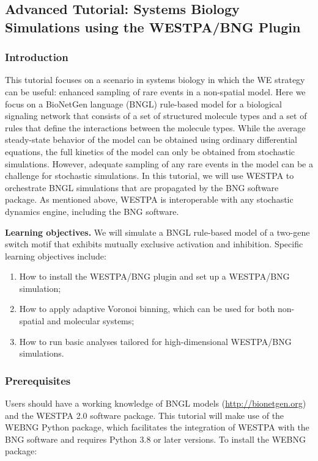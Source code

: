 \subsection{Advanced Tutorial: Systems Biology Simulations using the WESTPA/BNG Plugin}
\label{tut:bng-adv}

\subsubsection{Introduction}
This tutorial focuses on a scenario in systems biology in which the WE strategy can be useful: enhanced sampling of rare events in a non-spatial model. 
Here we focus on a BioNetGen language (BNGL) rule-based model for a biological signaling network that consists of a set of structured molecule types and a set of rules that define the interactions between the molecule types. 
While the average steady-state behavior of the model can be obtained using ordinary differential equations, the full kinetics of the model can only be obtained from stochastic simulations. 
However, adequate sampling of any rare events in the model can be a challenge for stochastic simulations. 
In this tutorial, we will use WESTPA to orchestrate BNGL simulations that are propagated by the BNG software package. 
As mentioned above, WESTPA is interoperable with any stochastic dynamics engine, including the BNG software.

\pagebreak

\textbf{Learning objectives.} We will simulate a BNGL rule-based model of a two-gene switch motif that exhibits mutually exclusive activation and inhibition.
Specific learning objectives include:
\begin{enumerate}
    \item How to install the WESTPA/BNG plugin and set up a WESTPA/BNG simulation; 
    \item How to apply adaptive Voronoi binning, which can be used for both non-spatial and molecular systems; 
    \item How to run basic analyses tailored for high-dimensional WESTPA/BNG simulations.
\end{enumerate} 

\subsubsection{Prerequisites}
Users should have a working knowledge of BNGL models ({\url{http://bionetgen.org}}) and the WESTPA 2.0 software package. 
This tutorial will make use of the WEBNG Python package, which facilitates the integration of WESTPA with the BNG software and requires Python 3.8 or later versions. 
To install the WEBNG package: 

